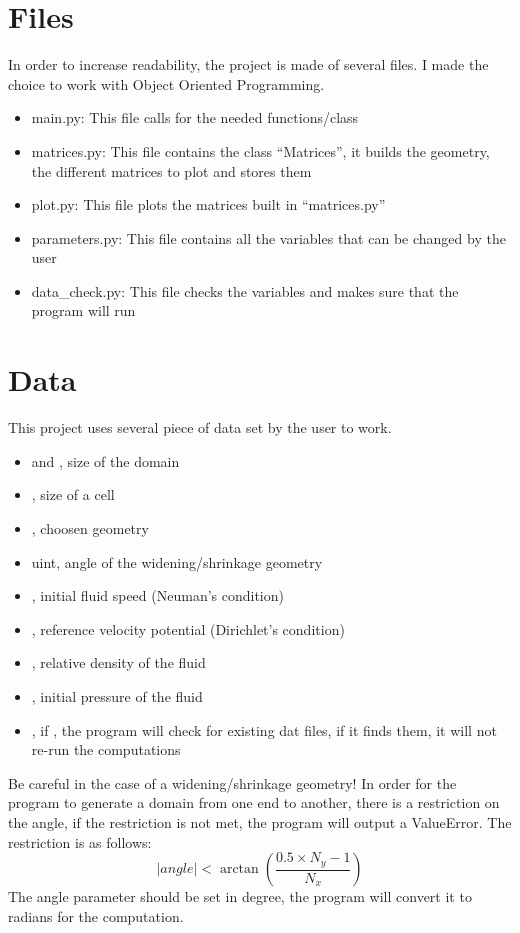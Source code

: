 \section{Files}
In order to increase readability, the project is made of several files.
I made the choice to work with Object Oriented Programming.
\begin{itemize}
      \item main.py: This file calls for the needed functions/class
      \item matrices.py: This file contains the class ``Matrices'', it builds
            the geometry, the different matrices to plot and stores them
      \item plot.py: This file plots the matrices built in ``matrices.py''
      \item parameters.py: This file contains all the variables that can be 
          changed by the user
      \item data\_check.py: This file checks the variables and makes sure that
          the program will run
\end{itemize}

\section{Data}
This project uses several piece of data set by the user to work.
\begin{itemize}
      \item {} \textcolor{dtype}{} and
             \textcolor{dtype}{}, size of the domain
      \item {} \textcolor{dtype}{}, size of a cell
      \item {}, choosen geometry
      \item {} \textcolor{dtype}{uint}, angle of the
            widening/shrinkage geometry
      \item {}, initial fluid speed (Neuman's condition)
      \item {}, reference velocity potential (Dirichlet's
            condition)
      \item {}, relative density of the fluid
      \item {}, initial pressure of the fluid
      \item {}, if , the program will check for
      existing dat files, if it finds them, it will not re-run the computations
\end{itemize}
Be careful in the case of a widening/shrinkage geometry!
In order for the program to generate a domain from one end to another, there is
a restriction on the angle, if the restriction is not met, the program will
output a ValueError. The restriction is as follows:
\[
      |angle| < \arctan{\left(\dfrac{0.5 \times N_y - 1}{N_x}\right)}
\]
The angle parameter should be set in degree, the program will convert it to
radians for the computation.

